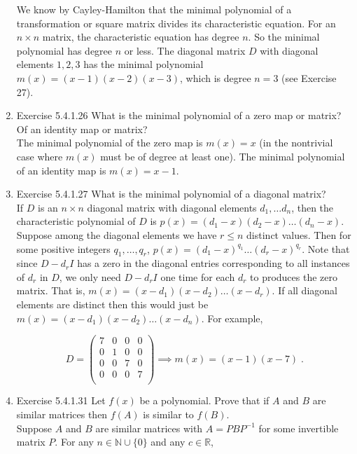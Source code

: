 \documentclass[a4paper]{article}
\begin{document}
\begin{enumerate}
We know by Cayley-Hamilton that the minimal polynomial of a transformation or square matrix divides its characteristic equation. For an $n\times n$ matrix, the characteristic equation has degree $n$. So the minimal polynomial has degree $n$ or less. The diagonal matrix $D$ with diagonal elements $1,2,3$ has the minimal polynomial $m(x) = (x-1)(x-2)(x-3)$, which is degree $n = 3$ (see Exercise 27). 

\item{Exercise 5.4.1.26} What is the minimal polynomial of a zero map or matrix? Of an identity map or matrix? \\

The minimal polynomial of the zero map is $m(x) = x$ (in the nontrivial case where $m(x)$ must be of degree at least one). The minimal polynomial of an identity map is $m(x) = x-1$. 

\item{Exercise 5.4.1.27}  What is the minimal polynomial of a diagonal matrix? \\

If $D$ is an $n\times n$ diagonal matrix with diagonal elements $d_1, \dots d_n$, then the characteristic polynomial of $D$ is $p(x) = (d_1  - x)(d_2 - x) \dots (d_n - x)$. Suppose among the diagonal elements we have $r \leq n$ distinct values. Then for some positive integers $q_1, \dots , q_r$, $p(x) = (d_1-x)^{q_1}\dots (d_r - x)^{q_r}$. Note that since $D - d_rI$ has a zero in the diagonal entries corresponding to all instances of $d_r$ in $D$, we only need $D-d_rI$ one time for each $d_r$ to produces the zero matrix. That is, $m(x) = (x-d_1)(x-d_2)\dots (x-d_r)$. If all diagonal elements are distinct then this would just be $m(x) = (x-d_1)(x-d_2)\dots (x-d_n)$. For example,

$$ 
D = \begin{pmatrix}
7 & 0 & 0 & 0 \\
0 & 1 & 0 & 0 \\
0 & 0 & 7 & 0 \\
0 & 0 & 0 & 7 \\
\end{pmatrix} \implies m(x) = (x-1)(x-7) \;.
$$

\item{Exercise 5.4.1.31} Let $f(x)$ be a polynomial. Prove that if $A$ and $B$ are similar matrices then $f(A)$
is similar to $f(B)$. \\

Suppose $A$ and $B$ are similar matrices with $A = PBP^{-1}$ for some invertible matrix $P$. For any $n \in \mathbb{N}\cup \{0\}$ and any $c \in \mathbb{R}$, 


\end{enumerate}
\end{document}
